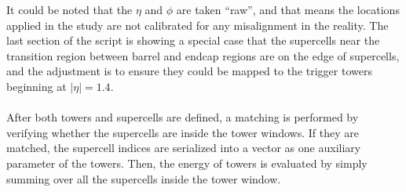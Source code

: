 \noindent
It could be noted that the $\eta$ and $\phi$ are taken ``raw'', and that means the locations applied in the study are not calibrated for any misalignment in the reality. The last section of the script is showing a special case that the supercells near the transition region between barrel and endcap regions are on the edge of supercells, and the adjustment is to ensure they could be mapped to the trigger towers beginning at $|\eta|=1.4$.
\\
\\After both towers and supercells are defined, a matching is performed by verifying whether the supercells are inside the tower windows. If they are matched, the supercell indices are serialized into a vector as one auxiliary parameter of the towers. Then, the energy of towers is evaluated by simply summing over all the supercells inside the tower window.
